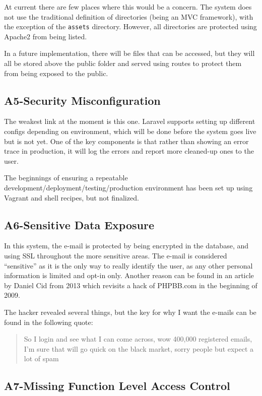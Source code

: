 At current there are few places where this would be a concern. The system does not use the traditional definition of directories (being an MVC framework), with the exception of the \texttt{assets} directory. However, all directories are protected using Apache2 from being listed.

In a future implementation, there will be files that can be accessed, but they will all be stored above the public folder and served using routes to protect them from being exposed to the public.

\subsection{A5-Security Misconfiguration}

The weakest link at the moment is this one. Laravel supports setting up different configs depending on environment, which will be done before the system goes live but is not yet. One of the key components is that
rather than showing an error trace in production, it will log the errors and report more cleaned-up ones to the user.

The beginnings of ensuring a repeatable development/deployment/testing/production environment has been set up using Vagrant and shell recipes, but not finalized.

\subsection{A6-Sensitive Data Exposure}

In this system, the e-mail is protected by being encrypted in the database, and using SSL throughout the more sensitive areas. The e-mail is considered ``sensitive'' as it is the only way to really identify the user, as any other personal information is limited and opt-in only. Another reason can be found in an article by Daniel Cid \citep{Sucuri2013} from 2013 which revisits a hack of PHPBB.com in the beginning of 2009.

The hacker revealed several things, but the key for why I want the e-mails can be found in the following quote:
\begin{quote}
So I login and see what I can come across, wow 400,000 registered emails, I’m sure that will go quick on the black market, sorry people but expect a lot of spam
\end{quote}

\subsection{A7-Missing Function Level Access Control}

